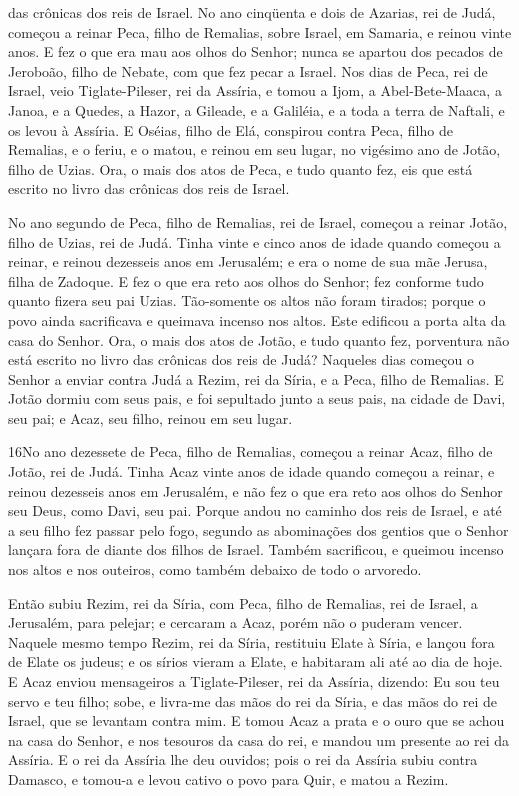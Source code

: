das crônicas dos reis de Israel. No ano cinqüenta e dois de
Azarias, rei de Judá, começou a reinar Peca, filho de Remalias,
sobre Israel, em Samaria, e reinou vinte anos. E fez o que
era mau aos olhos do Senhor; nunca se apartou dos pecados de
Jeroboão, filho de Nebate, com que fez pecar a Israel. Nos
dias de Peca, rei de Israel, veio Tiglate-Pileser, rei da Assíria, e
tomou a Ijom, a Abel-Bete-Maaca, a Janoa, e a Quedes, a Hazor, a
Gileade, e a Galiléia, e a toda a terra de Naftali, e os levou à
Assíria. E Oséias, filho de Elá, conspirou contra Peca, filho
de Remalias, e o feriu, e o matou, e reinou em seu lugar, no
vigésimo ano de Jotão, filho de Uzias. Ora, o mais dos atos
de Peca, e tudo quanto fez, eis que está escrito no livro das
crônicas dos reis de Israel.

No ano segundo de Peca, filho de Remalias, rei de Israel, começou
a reinar Jotão, filho de Uzias, rei de Judá. Tinha vinte e
cinco anos de idade quando começou a reinar, e reinou dezesseis anos
em Jerusalém; e era o nome de sua mãe Jerusa, filha de Zadoque.
E fez o que era reto aos olhos do Senhor; fez conforme tudo
quanto fizera seu pai Uzias. Tão-somente os altos não foram
tirados; porque o povo ainda sacrificava e queimava incenso nos
altos. Este edificou a porta alta da casa do Senhor. Ora, o
mais dos atos de Jotão, e tudo quanto fez, porventura não está
escrito no livro das crônicas dos reis de Judá? Naqueles dias
começou o Senhor a enviar contra Judá a Rezim, rei da Síria, e a
Peca, filho de Remalias. E Jotão dormiu com seus pais, e foi
sepultado junto a seus pais, na cidade de Davi, seu pai; e Acaz, seu
filho, reinou em seu lugar.

\medskip

\lettrine{16} No ano dezessete de Peca, filho de Remalias,
começou a reinar Acaz, filho de Jotão, rei de Judá. Tinha Acaz
vinte anos de idade quando começou a reinar, e reinou dezesseis anos
em Jerusalém, e não fez o que era reto aos olhos do Senhor seu Deus,
como Davi, seu pai. Porque andou no caminho dos reis de Israel,
e até a seu filho fez passar pelo fogo, segundo as abominações dos
gentios que o Senhor lançara fora de diante dos filhos de Israel.
Também sacrificou, e queimou incenso nos altos e nos outeiros,
como também debaixo de todo o arvoredo.

Então subiu Rezim, rei da Síria, com Peca, filho de Remalias, rei
de Israel, a Jerusalém, para pelejar; e cercaram a Acaz, porém não o
puderam vencer. Naquele mesmo tempo Rezim, rei da Síria,
restituiu Elate à Síria, e lançou fora de Elate os judeus; e os
sírios vieram a Elate, e habitaram ali até ao dia de hoje. E
Acaz enviou mensageiros a Tiglate-Pileser, rei da Assíria, dizendo:
Eu sou teu servo e teu filho; sobe, e livra-me das mãos do rei da
Síria, e das mãos do rei de Israel, que se levantam contra mim.
E tomou Acaz a prata e o ouro que se achou na casa do Senhor, e
nos tesouros da casa do rei, e mandou um presente ao rei da Assíria.
E o rei da Assíria lhe deu ouvidos; pois o rei da Assíria subiu
contra Damasco, e tomou-a e levou cativo o povo para Quir, e matou a
Rezim.

